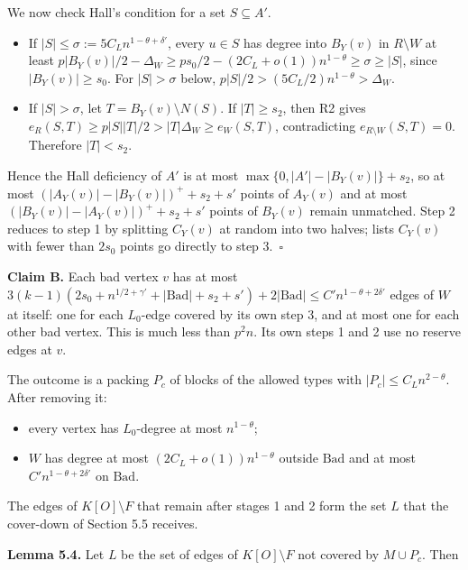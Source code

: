 \documentclass[english,11pt,a4paper]{article}
\providecommand{\tightlist}{\setlength{\itemsep}{0pt}\setlength{\parskip}{0pt}}
\begin{document}
We now check Hall's condition for a set \(S\subseteq A'\).

\begin{itemize}
\tightlist
\item
  If \(|S|\le\sigma:=5C_Ln^{1-\theta+\delta'}\), every \(u\in S\) has degree into \(B_Y(v)\) in \(R\setminus W\) at least \(p|B_Y(v)|/2-\Delta_W\ge ps_0/2-(2C_L+o(1))n^{1-\theta}\ge\sigma\ge|S|\), since \(|B_Y(v)|\ge s_0\). For \(|S|>\sigma\) below, \(p|S|/2>(5C_L/2)n^{1-\theta}>\Delta_W\).
\item
  If \(|S|>\sigma\), let \(T=B_Y(v)\setminus N(S)\). If \(|T|\ge s_2\), then R2 gives \(e_R(S,T)\ge p|S||T|/2>|T|\Delta_W\ge e_W(S,T)\), contradicting \(e_{R\setminus W}(S,T)=0\). Therefore \(|T|<s_2\).
\end{itemize}

Hence the Hall deficiency of \(A'\) is at most \(\max\{0,|A'|-|B_Y(v)|\}+s_2\), so at most \((|A_Y(v)|-|B_Y(v)|)^++s_2+s'\) points of \(A_Y(v)\) and at most \((|B_Y(v)|-|A_Y(v)|)^++s_2+s'\) points of \(B_Y(v)\) remain unmatched. Step 2 reduces to step 1 by splitting \(C_Y(v)\) at random into two halves; lists \(C_Y(v)\) with fewer than \(2s_0\) points go directly to step 3.~\(\square\)

\textbf{Claim B.} Each bad vertex \(v\) has at most \(3(k-1)(2s_0+n^{1/2+\gamma'}+|\mathrm{Bad}|+s_2+s')+2|\mathrm{Bad}|\le C'n^{1-\theta+2\delta'}\) edges of \(W\) at itself: one for each \(L_0\)-edge covered by its own step 3, and at most one for each other bad vertex. This is much less than \(p^2n\). Its own steps 1 and 2 use no reserve edges at \(v\).

The outcome is a packing \(P_c\) of blocks of the allowed types with \(|P_c|\le C_Ln^{2-\theta}\). After removing it:

\begin{itemize}
\tightlist
\item
  every vertex has \(L_0\)-degree at most \(n^{1-\theta}\);
\item
  \(W\) has degree at most \((2C_L+o(1))n^{1-\theta}\) outside \(\mathrm{Bad}\) and at most \(C'n^{1-\theta+2\delta'}\) on \(\mathrm{Bad}\).
\end{itemize}

The edges of \(K[O]\setminus F\) that remain after stages 1 and 2 form the set \(L\) that the cover-down of Section 5.5 receives.

\textbf{Lemma 5.4.} Let \(L\) be the set of edges of \(K[O]\setminus F\) not covered by \(M\cup P_c\). Then
\end{document}
